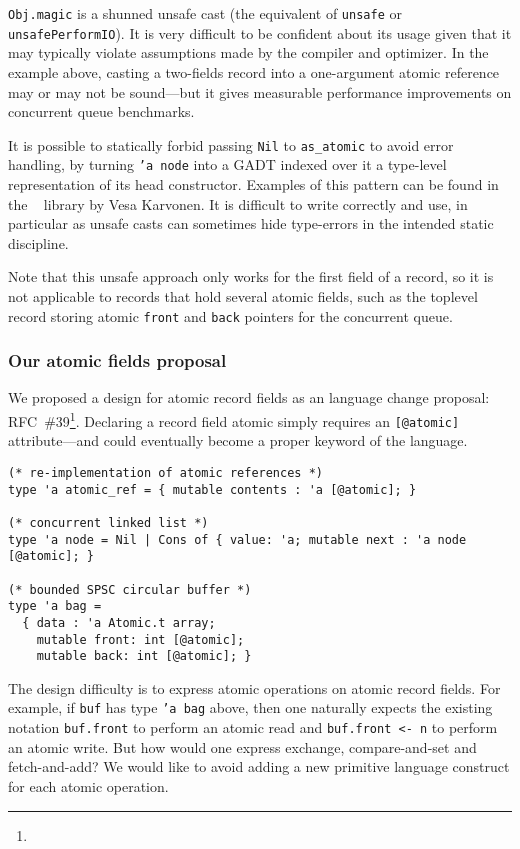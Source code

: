 \texttt{Obj.magic} is a shunned unsafe cast (the \OCaml equivalent of \texttt{unsafe} or \texttt{unsafePerformIO}).
It is very difficult to be confident about its usage given that it may typically violate assumptions made by the \OCaml compiler and optimizer.
In the example above, casting a two-fields record into a one-argument atomic reference may or may not be sound---but it gives measurable performance improvements on concurrent queue benchmarks.

It is possible to statically forbid passing \texttt{Nil} to \texttt{as_atomic} to avoid error handling, by turning \texttt{'a node} into a GADT indexed over it a type-level representation of its head constructor.
Examples of this pattern can be found in the \Kcas~\cite{kcas} library by Vesa Karvonen.
It is difficult to write correctly and use, in particular as unsafe casts can sometimes hide type-errors in the intended static discipline.

Note that this unsafe approach only works for the first field of a record, so it is not applicable to records that hold several atomic fields, such as the toplevel record storing atomic \texttt{front} and \texttt{back} pointers for the concurrent queue.

\subsubsection{Our atomic fields proposal}

We proposed a design for atomic record fields as an \OCaml language change proposal: RFC~\#39\footnote{}.
Declaring a record field atomic simply requires an \texttt{[@atomic]} attribute---and could eventually become a proper keyword of the language.

\begin{verbatim}
(* re-implementation of atomic references *)
type 'a atomic_ref = { mutable contents : 'a [@atomic]; }

(* concurrent linked list *)
type 'a node = Nil | Cons of { value: 'a; mutable next : 'a node [@atomic]; }

(* bounded SPSC circular buffer *)
type 'a bag =
  { data : 'a Atomic.t array;
    mutable front: int [@atomic];
    mutable back: int [@atomic]; }
\end{verbatim}

The design difficulty is to express atomic operations on atomic record fields.
For example, if \texttt{buf} has type \texttt{'a bag} above, then one naturally expects the existing notation \texttt{buf.front} to perform an atomic read and \texttt{buf.front <- n} to perform an atomic write.
But how would one express exchange, compare-and-set and fetch-and-add?
We would like to avoid adding a new primitive language construct for each atomic operation.

